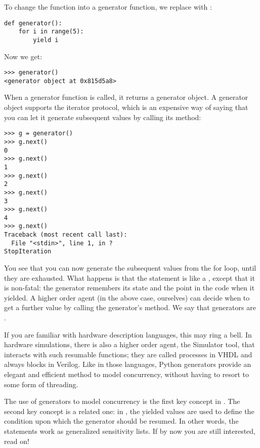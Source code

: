 To change the function into a generator function, we replace
 with :

\begin{verbatim}
def generator():
    for i in range(5):
        yield i

\end{verbatim}

Now we get:

\begin{verbatim}
>>> generator()
<generator object at 0x815d5a8>

\end{verbatim}

When a generator function is called, it returns a generator object. A
generator object supports the iterator protocol, which is an expensive
way of saying that you can let it generate subsequent values by
calling its  method:

\begin{verbatim}
>>> g = generator()
>>> g.next()
0
>>> g.next()
1
>>> g.next()
2
>>> g.next()
3
>>> g.next()
4
>>> g.next()
Traceback (most recent call last):
  File "<stdin>", line 1, in ?
StopIteration

\end{verbatim}

You see that you can now generate the subsequent values from the for
loop, until they are exhausted. What happens is that the
 statement is like a
, except that it is non-fatal: the generator remembers
its state and the point in the code when it yielded. A higher order
agent (in the above case, ourselves) can decide when to get a further
value by calling the generator's 
method. We say that generators are .

If you are familiar with hardware description languages, this may
ring a bell. In hardware simulations, there is also a higher order
agent, the Simulator tool, that interacts with such resumable
functions; they are called processes in VHDL and always blocks in
Verilog. Like in those languages, Python generators provide an elegant
and efficient method to model concurrency, without having to resort to
some form of threading.

The use of generators to model concurrency is the first key concept in
\myhdl{}. The second key concept is a related one: in \myhdl{}, the
yielded values are used to define the condition upon which the generator
should be resumed. In other words, the  statements work
as generalized sensitivity lists. If by now you are still interested,
read on!

